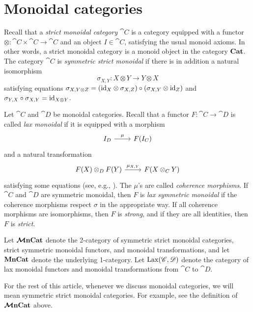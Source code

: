 \documentclass[11pt,oneside,article]{memoir}
\begin{document}
\section{Monoidal categories}\label{sec:prelim_monoidal}

Recall that a \emph{strict monoidal category} $\cat{C}$ is a category equipped with a functor
$\otimes\colon\cat{C}\times\cat{C}\to\cat{C}$ and an object $I\in\cat{C}$, satisfying the usual
monoid axioms. In other words, a strict monoidal category is a monoid object in the category $\mathbf{Cat}$.
The category $\cat{C}$ is \emph{symmetric strict monoidal} if there is in addition a natural isomorphism
\begin{equation*}
   \sigma_{X,Y}\colon X\otimes Y\to Y\otimes X
\end{equation*}
satisfying equations $\sigma_{X,Y\otimes Z}=(\mathrm{id}_X\otimes\sigma_{X,Z})\circ(\sigma_{X,Y}\otimes
\mathrm{id}_Z)$ and
$\sigma_{Y,X}\circ\sigma_{X,Y}=\mathrm{id}_{X\otimes Y}$.

Let $\cat{C}$ and $\cat{D}$ be monoidal categories. Recall that a functor
$F\colon\cat{C}\to\cat{D}$ is called \emph{lax monoidal} if it is equipped with a morphism
\[
\begin{tikzcd}
   I_D \rar{\mu} & F(I_C)
\end{tikzcd}
\]
and a natural transformation
\[
\begin{tikzcd}
   F(X) \otimes_D F(Y) \rar{\mu_{X,Y}} & F(X\otimes_C Y)
\end{tikzcd}
\]
satisfying some equations (see, e.g., \cite{Leinster,BorceuxV2}). The $\mu$'s are called \emph{coherence morphisms}. If $\cat{C}$ and $\cat{D}$ are symmetric monoidal, then $F$ is
\emph{lax symmetric monoidal} if the coherence morphisms respect $\sigma$ in the appropriate way. If all coherence morphisms
are isomorphisms, then $F$ is \emph{strong}, and if they are all
identities, then $F$ is \emph{strict}.

Let $\bm{\mathcal{M}}\mathbf{nCat}$ denote the 2-category of symmetric strict monoidal categories, strict symmetric
monoidal functors, and monoidal transformations, and let $\mathbf{MnCat}$ denote the underlying 1-category.
Let $\operatorname{Lax}(\mathscr{C},\mathscr{D})$ denote the category of lax monoidal functors and monoidal
transformations from $\cat{C}$ to $\cat{D}$.

\begin{warning}\label{warn:symmetric}
   For the rest of this article, whenever we discuss monoidal categories, we will mean symmetric
   strict monoidal categories. For example, see the definition of $\bm{\mathcal{M}}\mathbf{nCat}$ above.
\end{warning}
\end{document}
